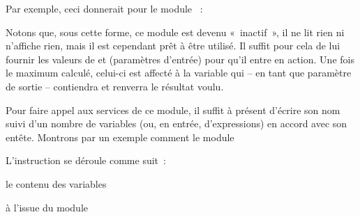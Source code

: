 	Par exemple, ceci donnerait pour le module ~:


	Notons que, sous cette forme, ce module est devenu «~inactif~», il ne
	lit rien ni n'affiche rien, mais il est cependant prêt à être utilisé. Il
	suffit pour cela de lui fournir les valeurs de  et
	 (paramètres d’entrée) pour qu’il entre en action.
	Une fois le maximum calculé, celui-ci est affecté à la variable
	 qui – en tant que paramètre de sortie –
	contiendra et renverra le résultat voulu.

	{Pour faire appel aux services de ce module, il
	suffit à présent d’écrire son nom suivi d’un nombre de variables (ou,
	en entrée, d'expressions) en accord avec son entête. Montrons par
	un exemple comment le module
	}


	{L’instruction
	 se déroule comme suit~:}
	
	\begin{liste}
	\item {
	{le contenu des variables
	}}
	\item {
	{à l’issue du module
	}}
	\end{liste}

